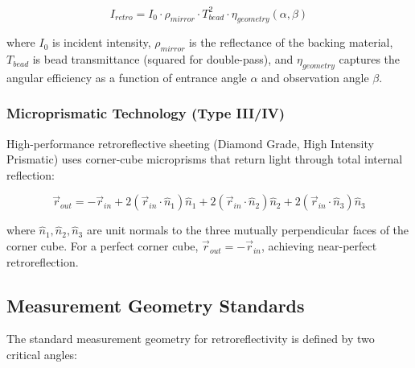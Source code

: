 \documentclass[11pt,a4paper]{article}
\begin{document}
\begin{equation}
I_{retro} = I_0 \cdot \rho_{mirror} \cdot T^2_{bead} \cdot \eta_{geometry}(\alpha, \beta)
\label{eq:bead_retro}
\end{equation}

where $I_0$ is incident intensity, $\rho_{mirror}$ is the reflectance of the backing material, $T_{bead}$ is bead transmittance (squared for double-pass), and $\eta_{geometry}$ captures the angular efficiency as a function of entrance angle $\alpha$ and observation angle $\beta$.

\subsubsection{Microprismatic Technology (Type III/IV)}

High-performance retroreflective sheeting (Diamond Grade, High Intensity Prismatic) uses corner-cube microprisms that return light through total internal reflection:

\begin{equation}
\vec{r}_{out} = -\vec{r}_{in} + 2(\vec{r}_{in} \cdot \hat{n}_1)\hat{n}_1 + 2(\vec{r}_{in} \cdot \hat{n}_2)\hat{n}_2 + 2(\vec{r}_{in} \cdot \hat{n}_3)\hat{n}_3
\label{eq:corner_cube}
\end{equation}

where $\hat{n}_1, \hat{n}_2, \hat{n}_3$ are unit normals to the three mutually perpendicular faces of the corner cube. For a perfect corner cube, $\vec{r}_{out} = -\vec{r}_{in}$, achieving near-perfect retroreflection.

\subsection{Measurement Geometry Standards}

The standard measurement geometry for retroreflectivity is defined by two critical angles:
\end{document}
